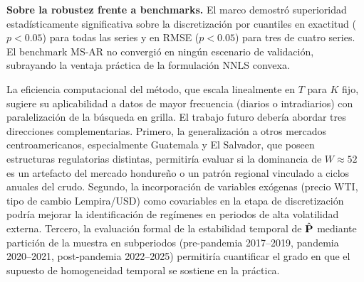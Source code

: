 \textbf{Sobre la robustez frente a benchmarks.}  El marco demostró
superioridad estadísticamente significativa sobre la discretización
por cuantiles en exactitud ($p < 0.05$) para todas las series y en
RMSE ($p < 0.05$) para tres de cuatro series.  El benchmark MS-AR
no convergió en ningún escenario de validación, subrayando la
ventaja práctica de la formulación NNLS convexa.

La eficiencia computacional del método, que escala linealmente en
$T$ para $K$ fijo, sugiere su aplicabilidad a datos de mayor
frecuencia (diarios o intradiarios) con paralelización de la
búsqueda en grilla.  El trabajo futuro debería abordar tres direcciones complementarias.  
Primero, la generalización a otros mercados centroamericanos, especialmente Guatemala 
y El Salvador, que poseen estructuras regulatorias distintas, 
permitiría evaluar si la dominancia de $W \approx 52$ es un artefacto del mercado hondureño 
o un patrón regional vinculado a ciclos anuales del crudo.  Segundo, la incorporación de 
variables exógenas (precio WTI, tipo de cambio Lempira/USD) como covariables en la etapa de 
discretización podría mejorar la identificación de regímenes en periodos de alta volatilidad externa.  
Tercero, la evaluación formal de la estabilidad temporal de $\hat{\mathbf{P}}$ mediante partición de la 
muestra en subperiodos (pre-pandemia 2017--2019, pandemia 2020--2021, post-pandemia 2022--2025) 
permitiría cuantificar el grado en que el supuesto de homogeneidad temporal se sostiene en la práctica.



